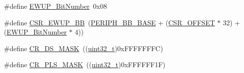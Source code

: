 \begin{DoxyCompactItemize}
\item 
\#define \hyperlink{group___p_w_r___private___defines_ga94fe0520e8f9b71fa2b99c0565ec70ea}{E\+W\+U\+P\+\_\+\+Bit\+Number}~0x08
\item 
\#define \hyperlink{group___p_w_r___private___defines_gaaff864595f697850b19173b0bca991b0}{C\+S\+R\+\_\+\+E\+W\+U\+P\+\_\+\+BB}~(\hyperlink{openmotestm_2library_2inc_2stm32f10x__map_8h_aed7efc100877000845c236ccdc9e144a}{P\+E\+R\+I\+P\+H\+\_\+\+B\+B\+\_\+\+B\+A\+SE} + (\hyperlink{openmotestm_2library_2src_2stm32f10x__rcc_8c_a984cbe73312b6d3d355c5053763d499a}{C\+S\+R\+\_\+\+O\+F\+F\+S\+ET} $\ast$ 32) + (\hyperlink{openmotestm_2library_2src_2stm32f10x__pwr_8c_a94fe0520e8f9b71fa2b99c0565ec70ea}{E\+W\+U\+P\+\_\+\+Bit\+Number} $\ast$ 4))
\item 
\#define \hyperlink{group___p_w_r___private___defines_ga8ee6bf9218f3c476629dd9ee70deef21}{C\+R\+\_\+\+D\+S\+\_\+\+M\+A\+SK}~((\hyperlink{_p_e___types_8h_a33594304e786b158f3fb30289278f5af}{uint32\+\_\+t})0x\+F\+F\+F\+F\+F\+F\+F\+C)
\item 
\#define \hyperlink{group___p_w_r___private___defines_gac4a30eebdd1d292331a578b189962e77}{C\+R\+\_\+\+P\+L\+S\+\_\+\+M\+A\+SK}~((\hyperlink{_p_e___types_8h_a33594304e786b158f3fb30289278f5af}{uint32\+\_\+t})0x\+F\+F\+F\+F\+F\+F1\+F)
\end{DoxyCompactItemize}
